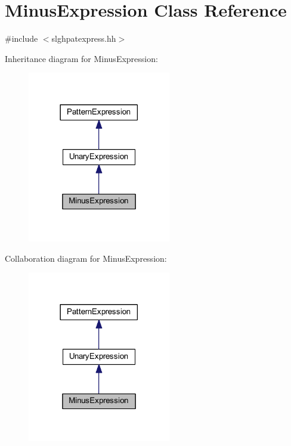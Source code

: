 \hypertarget{class_minus_expression}{}\section{Minus\+Expression Class Reference}
\label{class_minus_expression}


{\ttfamily \#include $<$slghpatexpress.\+hh$>$}



Inheritance diagram for Minus\+Expression\+:
\nopagebreak
\begin{figure}[H]
\begin{center}
\leavevmode
\includegraphics[width=177pt]{class_minus_expression__inherit__graph}
\end{center}
\end{figure}


Collaboration diagram for Minus\+Expression\+:
\nopagebreak
\begin{figure}[H]
\begin{center}
\leavevmode
\includegraphics[width=177pt]{class_minus_expression__coll__graph}
\end{center}
\end{figure}
